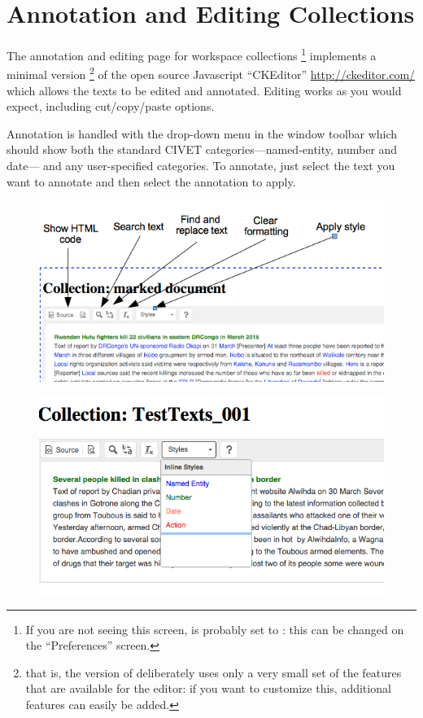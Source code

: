 \documentclass[letterpaper,10pt,english]{sphinxmanual}
\begin{document}
\chapter{Annotation and Editing Collections}
\label{annotation::doc}\label{annotation:annotation-and-editing-collections}
The annotation and editing page for workspace collections \footnote{
If you are not seeing this screen,   is
probably set to : this can be changed on the “Preferences”
screen.
} implements a
minimal version \footnote{
that is, the version of  deliberately uses only a very
small set of the features that are available for the editor: if you
want to customize this, additional features can easily be added.
} of the open source Javascript “CKEditor” \href{http://ckeditor.com/}{http://ckeditor.com/} which allows the
texts to be edited and annotated. Editing works as you would expect,
including cut/copy/paste options.

Annotation is handled with the  drop-down menu in the window
toolbar which should show both
the standard CIVET categories—named-entity, number and date— and any
user-specified categories. To annotate, just select the text you want to
annotate and then select the annotation to apply.
\begin{figure}[htbp]
\centering

\includegraphics{ckedit_menu.png}
\end{figure}
\begin{figure}[htbp]
\centering

\includegraphics{style_options.png}
\end{figure}
\end{document}
